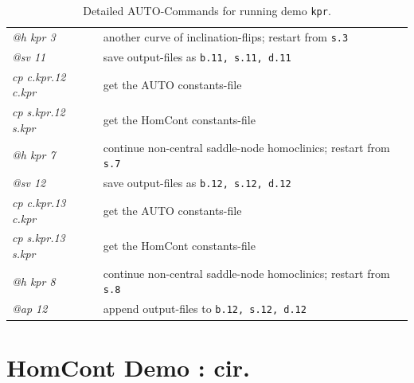 \documentclass[12pt]{report}
\begin{document}
\begin{table}[htbp]
\begin{center}
\begin{tabular}{| l | l |}
  {\it @h kpr 3} & another curve of inclination-flips; restart from {\tt s.3} \\ 
  {\it @sv 11} & save output-files as {\tt b.11, s.11, d.11} \\ 
\hline
  {\it cp c.kpr.12 c.kpr} & get the AUTO constants-file \\ 
  {\it cp s.kpr.12 s.kpr} & get the HomCont constants-file \\ 
  {\it @h kpr 7} & continue non-central saddle-node homoclinics; restart from {\tt s.7} \\ 
  {\it @sv 12} & save output-files as {\tt b.12, s.12, d.12} \\ 
\hline
  {\it cp c.kpr.13 c.kpr} & get the AUTO constants-file \\ 
  {\it cp s.kpr.13 s.kpr} & get the HomCont constants-file \\ 
  {\it @h kpr 8} & continue non-central saddle-node homoclinics; restart from {\tt s.8} \\ 
  {\it @ap 12} & append output-files to {\tt b.12, s.12, d.12} \\ 
\hline
\end{tabular}
\caption{Detailed {\cal AUTO}-Commands for running demo {\tt kpr}.}
\label{tbl:demo_kpr_2}
\end{center}
\end{table}



\chapter{ {\cal HomCont} Demo : cir.} \label{ch:HomCont_cir}

\end{document}

